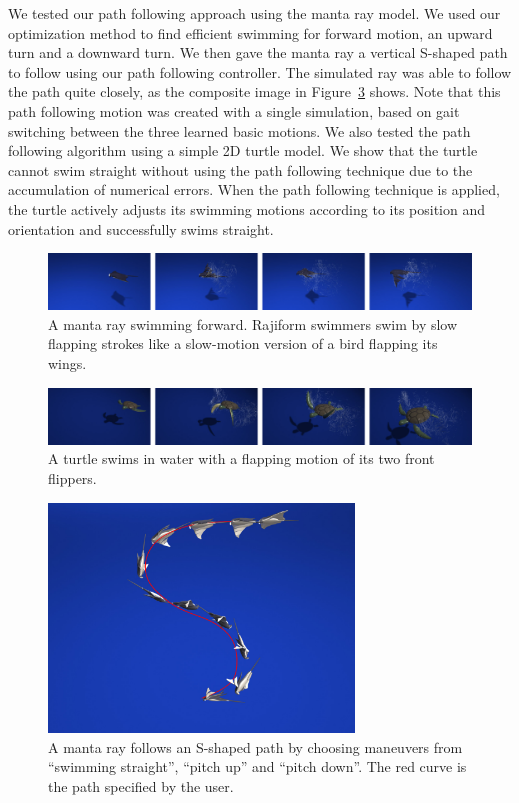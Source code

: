 We tested our path following approach using the manta ray model.  We used
our optimization method to find efficient swimming for forward motion, an
upward turn and a downward turn.  We then gave the manta ray a vertical
S-shaped path to follow using our path following controller.  The
simulated ray was able to follow the path quite closely, as the composite
image in Figure~\ref{fig:manta_path} shows.  Note that this path following
motion was created with a single simulation, based on gait switching
between the three learned basic motions. We also tested the path following
algorithm using a simple 2D turtle model. We show that the turtle cannot
swim straight without using the path following technique due to the
accumulation of numerical errors. When the path following technique is
applied, the turtle actively adjusts its swimming motions according to its
position and orientation and successfully swims straight.
\begin{figure}[t]
\centering
\includegraphics[width=\textwidth]{figures/manta.eps}
\caption{A manta ray swimming forward. Rajiform swimmers swim by slow flapping strokes like a slow-motion version of a bird flapping its wings.}
\label{fig:manta}
\end{figure}

\begin{figure}[t]
\centering
\includegraphics[width=\textwidth]{figures/turtle.eps}
\caption{A turtle swims in water with a flapping motion of its two front flippers. }
\label{fig:turtle}
\end{figure}

\begin{figure}[!b]
\centering
\includegraphics[width=3.2in]{figures/manta_path2.eps}
\caption{A manta ray follows an S-shaped path by choosing maneuvers from ``swimming straight'', ``pitch up'' and ``pitch down''. The red curve is the path specified by the user.}
\label{fig:manta_path}
\end{figure}

